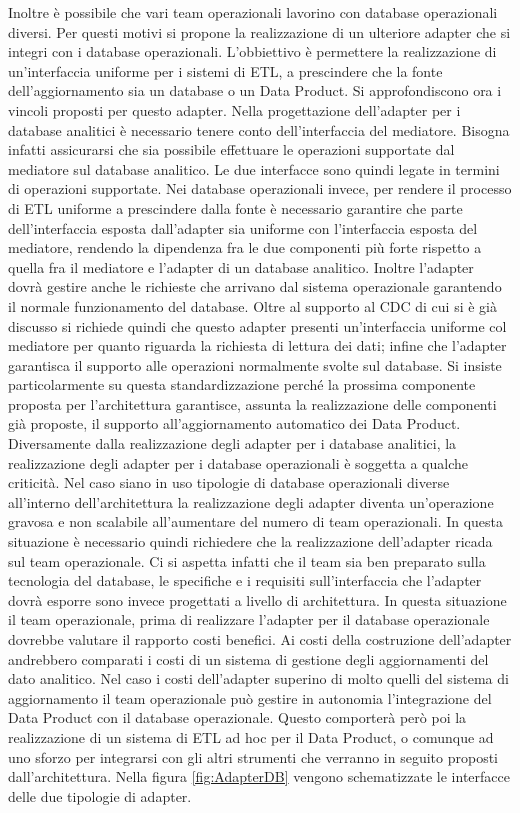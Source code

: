 \documentclass[12pt]{report}
\begin{document}
Inoltre è possibile che vari team operazionali lavorino con database operazionali diversi. 
Per questi motivi si propone la realizzazione di un ulteriore  adapter che si integri con i database operazionali.
L'obbiettivo è permettere la realizzazione di un'interfaccia uniforme per i sistemi di ETL, a prescindere che la fonte dell'aggiornamento sia un database o un Data Product.
Si approfondiscono ora i vincoli proposti per questo adapter.
Nella progettazione dell'adapter per i database analitici è necessario tenere conto dell'interfaccia del mediatore. 
Bisogna infatti assicurarsi che sia possibile effettuare le operazioni supportate dal mediatore sul database analitico.
Le due interfacce sono quindi legate in termini di operazioni supportate.
Nei database operazionali invece, per rendere il processo di ETL uniforme a prescindere dalla fonte è necessario garantire che parte dell'interfaccia esposta dall'adapter sia uniforme con l'interfaccia esposta del mediatore, rendendo la dipendenza fra le due componenti più forte rispetto a quella fra il mediatore e l'adapter di un database analitico.
Inoltre l'adapter dovrà gestire anche le richieste che arrivano dal sistema operazionale garantendo il normale funzionamento del database.
Oltre al supporto al CDC di cui si è già discusso si richiede quindi che questo adapter presenti un'interfaccia uniforme col mediatore per quanto riguarda la richiesta di lettura dei dati; infine che l'adapter garantisca il supporto alle operazioni normalmente svolte sul database.
Si insiste particolarmente su questa standardizzazione perché la prossima componente proposta per l'architettura garantisce, assunta la realizzazione delle componenti già proposte, il supporto all'aggiornamento automatico dei Data Product.
Diversamente dalla realizzazione degli adapter per i database analitici, la realizzazione degli adapter per i database operazionali è soggetta a qualche criticità.
Nel caso siano in uso tipologie di database operazionali diverse all'interno dell'architettura la realizzazione degli adapter diventa un'operazione gravosa e non scalabile all'aumentare del numero di team operazionali.
In questa situazione è necessario quindi richiedere che la realizzazione dell'adapter ricada sul team operazionale.
Ci si aspetta infatti che il team sia ben preparato sulla tecnologia del database, le specifiche e i requisiti sull'interfaccia che l'adapter dovrà esporre sono invece progettati a livello di architettura.
In questa situazione il team operazionale, prima di realizzare l'adapter per il database operazionale dovrebbe valutare il rapporto costi benefici.
Ai costi della costruzione dell'adapter andrebbero comparati i costi di un sistema di gestione degli aggiornamenti del dato analitico.
Nel caso i costi dell'adapter superino di molto quelli del sistema di aggiornamento il team operazionale può gestire in autonomia l'integrazione del Data Product con il database operazionale.
Questo comporterà però poi la realizzazione di un sistema di ETL ad hoc per il Data Product, o comunque ad uno sforzo per integrarsi con gli altri strumenti che verranno in seguito proposti dall'architettura.
Nella figura \ref{fig:AdapterDB} vengono schematizzate le interfacce delle due tipologie di adapter. 
\end{document}
